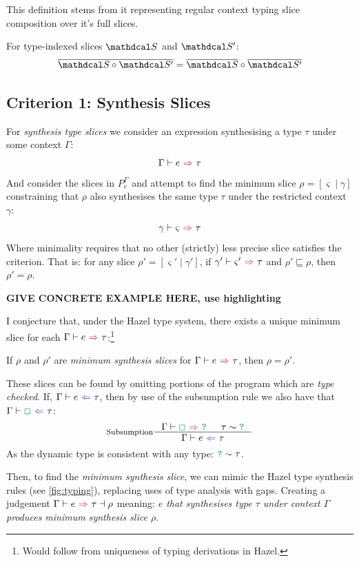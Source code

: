 This definition stems from it representing regular context typing slice composition over it's full slices.
\begin{proposition}
For type-indexed slices $\S$ and $\S'$: 
\[\overline{\S \circ \S'} = \overline{\S} \circ \overline{\S'}\]
\end{proposition}


\subsection{Criterion 1: Synthesis Slices}
\label{sec:SynthesisSlices}
For \textit{synthesis type slices} we consider an expression synthesising a type $\tau$ under some context $\Gamma$:
\[\synthesis{e}{\tau}\]
And consider the slices in $P_e^{\Gamma}$ and attempt to find the minimum slice $\rho = [\varsigma\mid \gamma]$ constraining that $\rho$ also synthesises the same type $\tau$ under the restricted context $\gamma$:
\[\synthesis[\gamma]{\varsigma}{\tau}\]
Where minimality requires that no other (strictly) less precise slice satisfies the criterion. That is: for any slice $\rho' = [\varsigma'\mid \gamma']$, if $\synthesis[\gamma']{\varsigma'}{\tau}$ and $\rho' \sqsubseteq \rho$, then $\rho' = \rho$.

\textbf{GIVE CONCRETE EXAMPLE HERE, use highlighting}

I conjecture that, under the Hazel type system, there exists a unique minimum slice for each $\synthesis{e}{\tau}$:\footnote{Would follow from uniqueness of typing derivations in Hazel.}
\begin{conjecture}[Uniqueness]\label{conj:SynthesisSliceUniqueness}
If $\rho$ and $\rho'$ are \textit{minimum synthesis slices} for $\synthesis{e}{\tau}$, then $\rho = \rho'$.
\end{conjecture}

These slices can be found by omitting portions of the program which are \textit{type checked}. If, $\analysis{e}{\tau}$, then by use of the subsumption rule we also have that $\analysis{\gap}{\tau}$:
\[\inference[Subsumption]{\synthesis{\gap}{\dyn} & \tau \sim \dyn}{\analysis{e}{\tau}}\] 
As the dynamic type is consistent with any type: ${\color{teal}\texttt{?}} \sim \tau$.

Then, to find the \textit{minimum synthesis slice}, we can mimic the Hazel type synthesis rules (see \cref{fig:typing}), replacing uses of type analysis with gaps. Creating a judgement $\synthesisslice{e}{\tau}{\rho}$ meaning: \textit{$e$ that synthesises type $\tau$ under context $\Gamma$ produces minimum synthesis slice $\rho$}.


